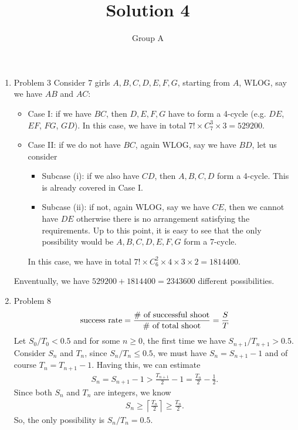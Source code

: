 \documentclass[10pt, onecolumn, draftcls]{IEEEtran}
\begin{document}
\title{Solution 4}
\author{Group A}
\maketitle


\begin{enumerate}
\item Problem 3
Consider 7 girls $A, B, C, D, E, F, G$, starting from $A$, WLOG, say we have $AB$ and $AC$:
\begin{itemize}
\item Case I: if we have $BC$, then $D, E, F, G$ have to form a 4-cycle (e.g. $DE$, $EF$, $FG$, $GD$). In this case, we have in total $7!\times C_7^3\times 3 = 529200$.
\item Case II: if we do not have $BC$, again WLOG, say we have $BD$, let us consider
\begin{itemize}
\item Subcase (i): if we also have $CD$, then $A, B, C, D$ form a 4-cycle. This is already covered in Case I.
\item Subcase (ii): if not, again WLOG, say we have $CE$, then we cannot have $DE$ otherwise there is no arrangement satisfying the requirements. Up to this point,  it is easy to see that the only possibility would be $A, B, C, D, E, F, G$ form a 7-cycle.
\end{itemize}
In this case, we have in total $7!\times C_6^2\times 4\times 3\times 2 = 1814400$.
\end{itemize}
Enventually, we have $529200 + 1814400 = 2343600$ different possibilities.

\item Problem 8
\begin{align*}
\textup{success rate} = \frac{\textup{\# of successful shoot}}{\textup{\# of total shoot}} = \frac{S}{T}
\end{align*}
Let $S_0/T_0 < 0.5$ and for some $n\geq 0$, the first time we have $S_{n+1}/T_{n+1} > 0.5$. Consider $S_n$ and $T_n$, since $S_n/T_n \leq 0.5$, we must have $S_n = S_{n+1}-1$ and of course $T_n = T_{n+1} - 1$. Having this, we can estimate
\begin{align*}
S_n = S_{n+1} - 1 > \frac{T_{n+1}}{2} - 1 = \frac{T_n}{2} - \frac{1}{2}.
\end{align*}
Since both $S_n$ and $T_n$ are integers, we know
\begin{align*}
S_n \geq \left\lceil \frac{T_n}{2} \right\rceil\geq \frac{T_n}{2}.
\end{align*}
So, the only possibility is $S_n/T_n = 0.5$.



\end{enumerate}
\end{document}
